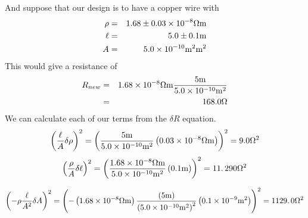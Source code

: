And suppose that our design is to have a copper wire with 
\begin{eqnarray*}
\rho &=&1.68\pm 0.03\times 10^{-8}\unit{%
\Omega%
}\unit{m} \\
\ell &=&5.0\pm 0.1\unit{m} \\
A &=&5.0\times 10^{-10}\unit{m}^{2}\unit{m}^{2}
\end{eqnarray*}%
This would give a resistance of 
\begin{eqnarray*}
R_{new} &=&1.68\times 10^{-8}\unit{%
\Omega%
}\unit{m}\frac{5\unit{m}}{5.0\times 10^{-10}\unit{m}^{2}} \\
&=&168.0\unit{%
\Omega%
}
\end{eqnarray*}%
We can calculate each of our terms from the $\delta R$ equation. 
\begin{equation*}
\left( \frac{\ell }{A}\delta \rho \right) ^{2}=\left( \frac{5\unit{m}}{%
5.0\times 10^{-10}\unit{m}^{2}}\left( 0.03\times 10^{-8}\unit{%
\Omega%
}\unit{m}\right) \right) ^{2}=9.0\unit{%
\Omega%
}^{2}
\end{equation*}%
\begin{equation*}
\left( \frac{\rho }{A}\delta \ell \right) ^{2}=\left( \frac{1.68\times
10^{-8}\unit{%
\Omega%
}\unit{m}}{5.0\times 10^{-10}\unit{m}^{2}}\left( 0.1\unit{m}\right) \right)
^{2}=11.\,\allowbreak 290\unit{%
\Omega%
}^{2}
\end{equation*}

\begin{equation*}
\left( -\rho \frac{\ell }{A^{2}}\delta A\right) ^{2}=\left( -\left(
1.68\times 10^{-8}\unit{%
\Omega%
}\unit{m}\right) \frac{\left( 5\unit{m}\right) }{\left( 5.0\times 10^{-10}%
\unit{m}^{2}\right) ^{2}}\left( 0.1\times 10^{-9}\unit{m}^{2}\right) \right)
^{2}=1129.\,\allowbreak 0\unit{%
\Omega%
}^{2}
\end{equation*}

